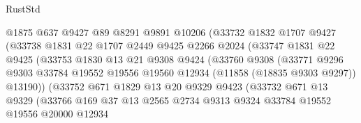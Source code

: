 \begin{lexlean}{RustStd}
\begin{coremodule}
                          @1875
                          @637
                          @9427
                          @89
                          @8291
                          @9891
                          @10206
                          (@33732
                            @1832
                            @1707
                            @9427
                            (@33738
                              @1831
                              @22
                              @1707
                              @2449
                              @9425
                              @2266
                              @2024
                              (@33747
                                @1831
                                @22
                                @9425
                                (@33753
                                  @1830
                                  @13
                                  @21
                                  @9308
                                  @9424
                                  (@33760
                                    @9308
                                    (@33771
                                      @9296
                                      @9303
                                      @33784
                                      @19552
                                      @19556
                                      @19560
                                      @12934
                                      (@11858 (@18835 @9303 @9297))
                                      @13190))
                                  (@33752
                                    @671
                                    @1829
                                    @13
                                    @20
                                    @9329
                                    @9423
                                    (@33732
                                      @671
                                      @13
                                      @9329
                                      (@33766
                                        @169
                                        @37
                                        @13
                                        @2565
                                        @2734
                                        @9313
                                        @9324
                                        @33784
                                        @19552
                                        @19556
                                        @20000
                                        @12934

\end{coremodule}
\end{lexlean}
